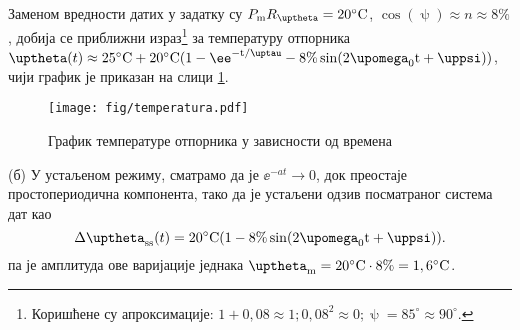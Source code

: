 Заменом вредности датих у задатку су 
${P_{\rm m} R_{\uptheta}} = 20^\circ\rm C$,
$\cos(\uppsi) \approx n \approx 8\%$, добија се приближни израз\footnote{
    Коришћене су апроксимације: $1 + 0,08\approx 1; 0,08^2 \approx 0; \uppsi = 85^\circ \approx 90^\circ$.
}
за температуру отпорника 
$
    \uptheta(t) \approx 25^\circ{\rm C} + 
    20^\circ\rm C( 1 - \ee^{-t/\uptau} - 8\% \sin(2\upomega_0 t + \uppsi) )
$, чији график је приказан на слици \ref{fig:\ID.}.

\begin{figure}[!ht]
\centering
\texttt{[image: fig/temperatura.pdf]}
\caption{График температуре отпорника у зависности од времена}
\label{fig:\ID.}
\end{figure}

(б) У устаљеном режиму, сматрамо да је $\ee^{-at} \to 0$, док преостаје простопериодична компонента, тако да је 
устаљени одзив посматраног система дат као 
\begin{equation}
    \Delta\uptheta_{\rm ss}(t) =  20^\circ\rm C( 1 - 8\% \sin(2\upomega_0 t + \uppsi) ).
\end{equation}
па је амплитуда ове варијације једнака $\uptheta_{\rm m} = 20^\circ\rm C \cdot 8\% = 1,6^\circ\rm C$. 

